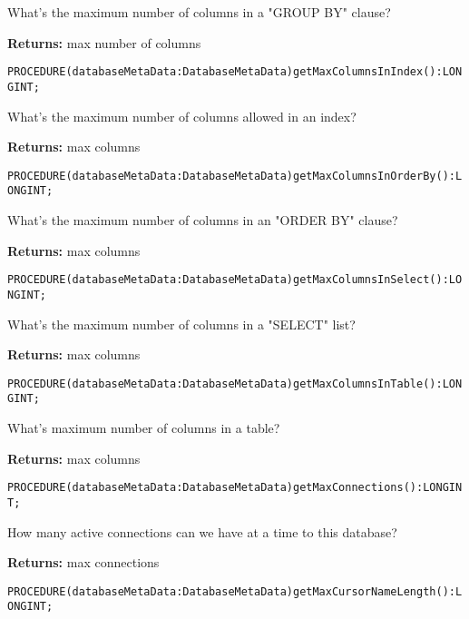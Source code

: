 What's the maximum number of columns in a "GROUP BY" clause? 


{\bf Returns: } 
max number of columns 




\verb'PROCEDURE(databaseMetaData:DatabaseMetaData)getMaxColumnsInIndex():LONGINT;'






What's the maximum number of columns allowed in an index? 


{\bf Returns: } 
max columns 




\verb'PROCEDURE(databaseMetaData:DatabaseMetaData)getMaxColumnsInOrderBy():LONGINT;'






What's the maximum number of columns in an "ORDER BY" clause? 


{\bf Returns: } 
max columns 




\verb'PROCEDURE(databaseMetaData:DatabaseMetaData)getMaxColumnsInSelect():LONGINT;'






What's the maximum number of columns in a "SELECT" list? 


{\bf Returns: } 
max columns 




\verb'PROCEDURE(databaseMetaData:DatabaseMetaData)getMaxColumnsInTable():LONGINT;'






What's maximum number of columns in a table? 


{\bf Returns: } 
max columns 




\verb'PROCEDURE(databaseMetaData:DatabaseMetaData)getMaxConnections():LONGINT;'






How many active connections can we have at a time to this database? 


{\bf Returns: } 
max connections 




\verb'PROCEDURE(databaseMetaData:DatabaseMetaData)getMaxCursorNameLength():LONGINT;'






